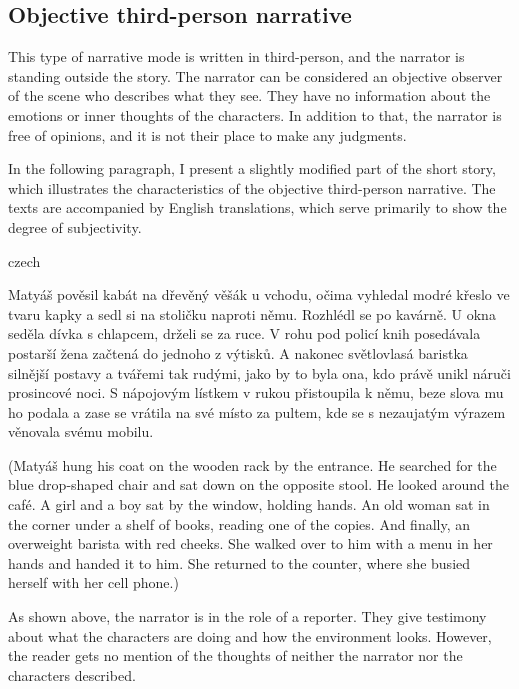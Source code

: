 \subsection{Objective third-person narrative}
This type of narrative mode is written in third-person, and the narrator is standing outside the story. The narrator can be considered an objective observer of the scene who describes what they see. They have no information about the emotions or inner thoughts of the characters. \cite{docekalova} In addition to that, the narrator is free of opinions, and it is not their place to make any judgments.

In the following paragraph, I present a slightly modified part of the short story, which illustrates the characteristics of the objective third-person narrative. The texts are accompanied by English translations, which serve primarily to show the degree of subjectivity.
\newline

\begin{otherlanguage*}{czech}
\begin{quoting}
Matyáš pověsil kabát na dřevěný věšák u vchodu, očima vyhledal modré křeslo ve tvaru kapky a sedl si na stoličku naproti němu. Rozhlédl se po kavárně. U okna seděla dívka s chlapcem, drželi se za ruce. V rohu pod policí knih posedávala postarší žena začtená do jednoho z výtisků. A nakonec světlovlasá baristka silnější postavy a tvářemi tak rudými, jako by to byla ona, kdo právě unikl náruči prosincové noci. S nápojovým lístkem v rukou přistoupila k němu, beze slova mu ho podala a zase se vrátila na své místo za pultem, kde se s nezaujatým výrazem věnovala svému mobilu.
\newline
\end{quoting}
\end{otherlanguage*}
\begin{quoting}
(Matyáš hung his coat on the wooden rack by the entrance. He searched for the blue drop-shaped chair and sat down on the opposite stool. He looked around the café. A girl and a boy sat by the window, holding hands. An old woman sat in the corner under a shelf of books, reading one of the copies. And finally, an overweight barista with red cheeks. She walked over to him with a menu in her hands and handed it to him. She returned to the counter, where she busied herself with her cell phone.)
\newline
\end{quoting}

As shown above, the narrator is in the role of a reporter. They give testimony about what the characters are doing and how the environment looks. However, the reader gets no mention of the thoughts of neither the narrator nor the characters described.


